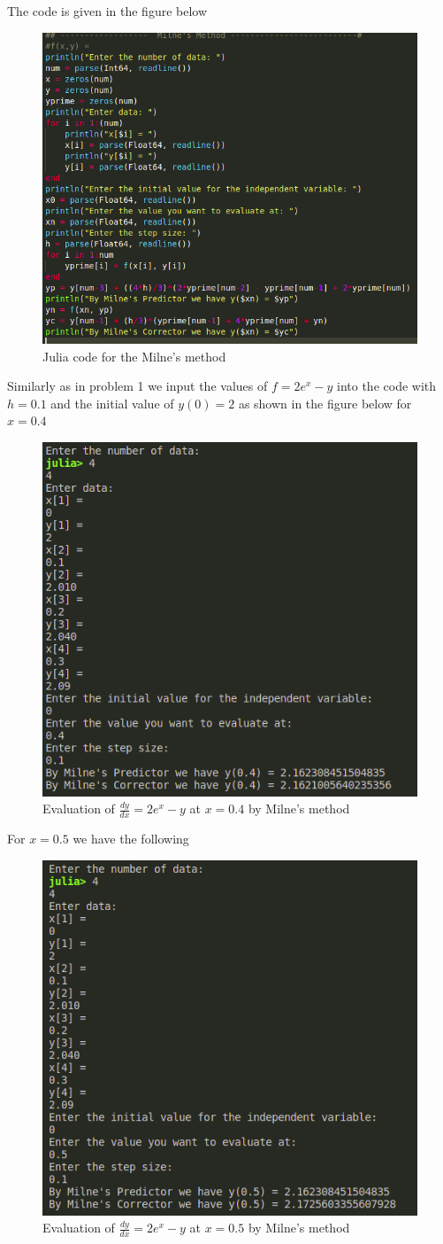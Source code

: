 \documentclass[a4paper,12pt,openany]{book}
\begin{document}
\begin{soln}
	The code is given in the figure below
	\begin{figure}[H]
		\centering
		\includegraphics[width = .7\linewidth]{pic4}
		\caption{Julia code for the Milne's method}
	\end{figure}

Similarly as in problem 1 we input the values of $f = 2e^x - y$ into the code with $h = 0.1$ and the initial value of $y(0) = 2$ as shown in the figure below for $x = 0.4$
\begin{figure}[H]
	\centering
	\includegraphics[width=.5\linewidth]{pic5}
	\caption{Evaluation of $\frac{dy}{dx} = 2e^x - y$ at $x = 0.4$ by Milne's method}
\end{figure}
For $x = 0.5$ we have the following
\begin{figure}[H]
	\centering
	\includegraphics[width = .7\linewidth]{pic6}
	\caption{Evaluation of $\frac{dy}{dx} = 2e^x - y$ at $x = 0.5$ by Milne's method}
\end{figure}

\end{soln}
\end{document}

